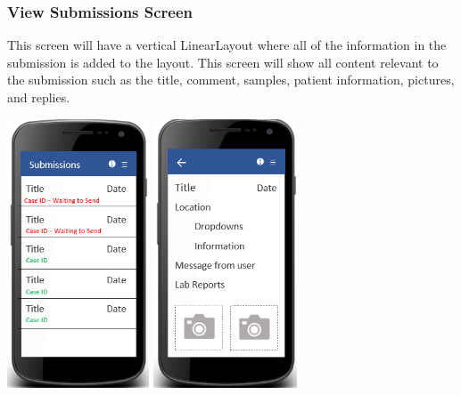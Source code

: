 \documentclass[onecolumn, draftclsnofoot,10pt, compsoc]{IEEEtran}
\begin{document}
\subsubsection{View Submissions Screen}
This screen will have a vertical LinearLayout where all of the information in the submission is added to the layout. This screen will show all content relevant to the submission such as the title, comment, samples, patient information, pictures, and replies.
\newline
\begin{center}
\includegraphics[height=8cm]{submissionscreen.png}
\includegraphics[height=8cm]{detailsscreen.png}
\end{center}

\end{document}
